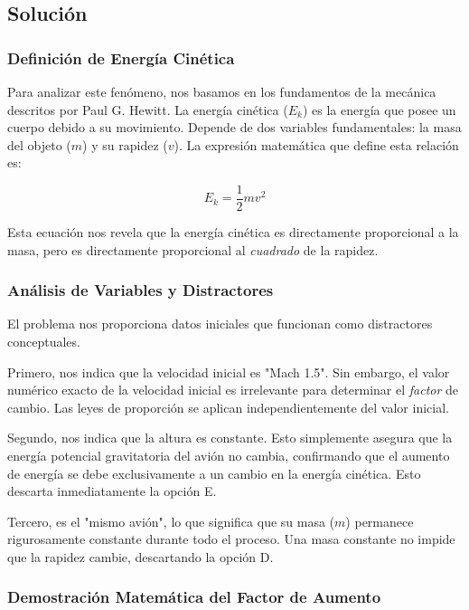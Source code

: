 \documentclass[12pt, a4paper]{article}
\begin{document}
\subsection*{Solución}

\subsubsection*{Definición de Energía Cinética}

Para analizar este fenómeno, nos basamos en los fundamentos de la mecánica descritos por Paul G. Hewitt. La energía cinética ($E_k$) es la energía que posee un cuerpo debido a su movimiento. Depende de dos variables fundamentales: la masa del objeto ($m$) y su rapidez ($v$). La expresión matemática que define esta relación es:

\begin{equation}
E_k = \frac{1}{2}mv^2
\end{equation}

Esta ecuación nos revela que la energía cinética es directamente proporcional a la masa, pero es directamente proporcional al \textit{cuadrado} de la rapidez.

\subsubsection*{Análisis de Variables y Distractores}

El problema nos proporciona datos iniciales que funcionan como distractores conceptuales. 

Primero, nos indica que la velocidad inicial es "Mach 1.5". Sin embargo, el valor numérico exacto de la velocidad inicial es irrelevante para determinar el \textit{factor} de cambio. Las leyes de proporción se aplican independientemente del valor inicial.

Segundo, nos indica que la altura es constante. Esto simplemente asegura que la energía potencial gravitatoria del avión no cambia, confirmando que el aumento de energía se debe exclusivamente a un cambio en la energía cinética. Esto descarta inmediatamente la opción E.

Tercero, es el "mismo avión", lo que significa que su masa ($m$) permanece rigurosamente constante durante todo el proceso. Una masa constante no impide que la rapidez cambie, descartando la opción D.

\subsubsection*{Demostración Matemática del Factor de Aumento}
\end{document}
